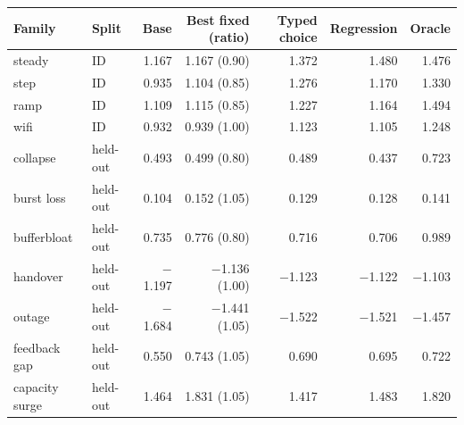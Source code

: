 \begin{tabular}{llrrrrr}
\toprule
Family & Split & Base & Best fixed (ratio) & Typed choice & Regression & Oracle \\
\midrule
steady & ID & 1.167 & 1.167 (0.90) & 1.372 & 1.480 & 1.476 \\
step & ID & 0.935 & 1.104 (0.85) & 1.276 & 1.170 & 1.330 \\
ramp & ID & 1.109 & 1.115 (0.85) & 1.227 & 1.164 & 1.494 \\
wifi & ID & 0.932 & 0.939 (1.00) & 1.123 & 1.105 & 1.248 \\
collapse & held-out & 0.493 & 0.499 (0.80) & 0.489 & 0.437 & 0.723 \\
burst loss & held-out & 0.104 & 0.152 (1.05) & 0.129 & 0.128 & 0.141 \\
bufferbloat & held-out & 0.735 & 0.776 (0.80) & 0.716 & 0.706 & 0.989 \\
handover & held-out & $-$1.197 & $-$1.136 (1.00) & $-$1.123 & $-$1.122 & $-$1.103 \\
outage & held-out & $-$1.684 & $-$1.441 (1.05) & $-$1.522 & $-$1.521 & $-$1.457 \\
feedback gap & held-out & 0.550 & 0.743 (1.05) & 0.690 & 0.695 & 0.722 \\
capacity surge & held-out & 1.464 & 1.831 (1.05) & 1.417 & 1.483 & 1.820 \\
\bottomrule
\end{tabular}
